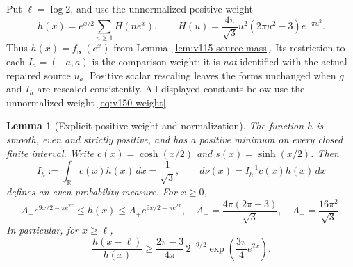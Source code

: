 \documentclass[11pt]{article}
\newtheorem{lemma}[theorem]{Lemma}
\theoremstyle{remark}
\begin{document}
Put $\ell=\log2$, and use the unnormalized positive weight
\begin{equation}\label{eq:v150-weight}
 h(x)=e^{x/2}\sum_{n\ge1}H(ne^x),\qquad
 H(u)=\frac{4\pi}{\sqrt3}u^2(2\pi u^2-3)e^{-\pi u^2}.
\end{equation}
Thus $h(x)=f_\infty(e^x)$ from Lemma~\ref{lem:v115-source-mass}.
Its restriction to each $I_a=(-a,a)$ is the comparison weight; it is
\emph{not} identified with the actual repaired source $u_a$. Positive
scalar rescaling leaves the forms unchanged when $g$ and $I_h$ are
rescaled consistently. All displayed constants below use the
unnormalized weight \eqref{eq:v150-weight}.

\begin{lemma}[Explicit positive weight and normalization]
\label{lem:v150-weight}
The function $h$ is smooth, even and strictly positive, and has a positive
minimum on every closed finite interval. Write $c(x)=\cosh(x/2)$ and
$s(x)=\sinh(x/2)$. Then
\begin{equation}\label{eq:v150-pole-mass}
 I_h:=\int_{\mathbb R}c(x)h(x)\,dx=\frac1{\sqrt3},
 \qquad d\nu(x)=I_h^{-1}c(x)h(x)\,dx
\end{equation}
defines an even probability measure. For $x\ge0$,
\begin{equation}\label{eq:v150-weight-bounds}
 A_-e^{9x/2-\pi e^{2x}}\le h(x)\le A_+e^{9x/2-\pi e^{2x}},
 \quad A_-=\frac{4\pi(2\pi-3)}{\sqrt3},\quad
 A_+=\frac{16\pi^2}{\sqrt3}.
\end{equation}
In particular, for $x\ge\ell$,
\begin{equation}\label{eq:v150-weight-ratio}
 \frac{h(x-\ell)}{h(x)}\ge
 \frac{2\pi-3}{4\pi}\,2^{-9/2}
             \exp\!\left(\frac{3\pi}{4}e^{2x}\right).
\end{equation}
\end{lemma}
\end{document}
